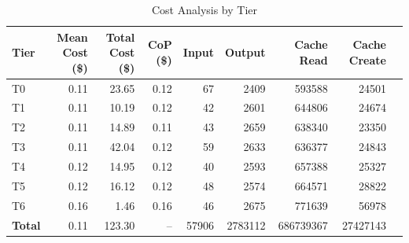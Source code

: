 \begin{table}[htbp]
\centering
\caption{Cost Analysis by Tier}
\label{tab:cost_analysis}
\small
\begin{tabular}{lrrrrrrrr}
\toprule
Tier & Mean Cost (\$) & Total Cost (\$) & CoP (\$) & Input & Output & Cache Read & Cache Create \\
\midrule
T0 & 0.11 & 23.65 & 0.12 & 67 & 2409 & 593588 & 24501 \\
T1 & 0.11 & 10.19 & 0.12 & 42 & 2601 & 644806 & 24674 \\
T2 & 0.11 & 14.89 & 0.11 & 43 & 2659 & 638340 & 23350 \\
T3 & 0.11 & 42.04 & 0.12 & 59 & 2633 & 636377 & 24843 \\
T4 & 0.12 & 14.95 & 0.12 & 40 & 2593 & 657388 & 25327 \\
T5 & 0.12 & 16.12 & 0.12 & 48 & 2574 & 664571 & 28822 \\
T6 & 0.16 & 1.46 & 0.16 & 46 & 2675 & 771639 & 56978 \\
\textbf{Total} & 0.11 & 123.30 & -- & 57906 & 2783112 & 686739367 & 27427143 \\
\bottomrule
\end{tabular}
\end{table}
